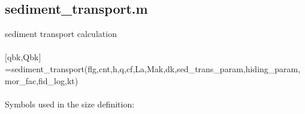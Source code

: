 \subsection{sediment\_transport.m}
sediment transport calculation  \\ 
 \\ 
$[$qbk,Qbk$]$=sediment\_transport(flg,cnt,h,q,cf,La,Mak,dk,sed\_trans\_param,hiding\_param,mor\_fac,fid\_log,kt) \\ 
 \\ 
Symbols used in the size definition: \\ 
    \\ 
